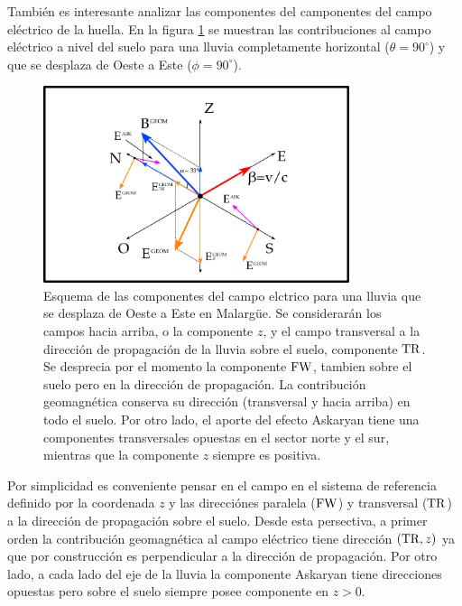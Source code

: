 	También es interesante analizar las componentes del camponentes del campo eléctrico de la huella.
	En la figura \ref{fig:malField} se muestran las contribuciones al campo eléctrico a nivel del suelo para una lluvia completamente horizontal ($\theta=90^\circ$) y que se desplaza de Oeste a Este ($\phi=90^\circ$).
	\begin{figure}[ht!]
		\centering
		\includegraphics[width=0.8\textwidth]{./fig/simulacionRadio/malField}
		\caption{\label{fig:malField}
		Esquema de las componentes del campo elctrico para una lluvia que se desplaza de Oeste a Este en Malargüe. Se considerarán los campos hacia arriba, o la componente $z$, y el campo transversal a la dirección de propagación de la lluvia sobre el suelo, componente ${\rm TR}$. Se desprecia por el momento la componente ${\rm FW}$, tambien sobre el suelo pero en la dirección de propagación. La contribución geomagnética conserva su dirección (transversal y hacia arriba) en todo el suelo. Por otro lado, el aporte del efecto Askaryan tiene una componentes transversales opuestas en el sector norte y el sur, mientras que la componente $z$ siempre es positiva.
		}
	\end{figure}
	Por simplicidad es conveniente pensar en el campo en el sistema de referencia definido por la coordenada $z$ y las direcciónes paralela (${\rm FW}$) y transversal (${\rm TR}$) a la dirección de propagación sobre el suelo.
	Desde esta persectiva, a primer orden la contribución geomagnética al campo eléctrico tiene dirección $({\rm TR},z)$ ya que por construcción es perpendicular a la dirección de propagación.
	Por otro lado, a cada lado del eje de la lluvia la componente Askaryan tiene direcciones opuestas pero sobre el suelo siempre posee componente en $z>0$.
	
